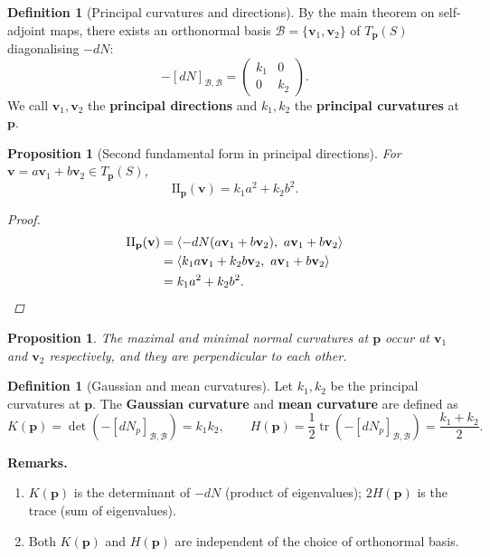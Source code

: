 \documentclass[10pt, a4paper]{article}
\theoremstyle{plain}
\newtheorem{proposition}[theorem]{Proposition}
\theoremstyle{definition}
\newtheorem{definition}[theorem]{Definition}
\theoremstyle{remark}
\begin{document}
\begin{definition}[Principal curvatures and directions]
  By the main theorem on self-adjoint maps, there exists an orthonormal basis
  $\mathcal{B} = \{\mathbf{v}_1, \mathbf{v}_2\}$ of $T_{\mathbf{p}}(S)$ diagonalising $-dN$:
  \[
    -[dN]_{\mathcal{B},\mathcal{B}} = \begin{pmatrix} k_1 & 0 \\ 0 & k_2 \end{pmatrix}.
  \]
  We call $\mathbf{v}_1, \mathbf{v}_2$ the \textbf{principal directions} and $k_1, k_2$ the
  \textbf{principal curvatures} at $\mathbf{p}$.
\end{definition}

\begin{proposition}[Second fundamental form in principal directions]
  For $\mathbf{v} = a\mathbf{v}_1 + b\mathbf{v}_2 \in T_{\mathbf{p}}(S)$,
  \[
    \mathrm{II}_{\mathbf{p}}(\mathbf{v}) = k_1 a^2 + k_2 b^2.
  \]

\begin{proof}
  \begin{align*}
    \mathrm{II}_{\mathbf{p}}(\mathbf{v})
    &= \langle -dN(a\mathbf{v}_1 + b\mathbf{v}_2),\ a\mathbf{v}_1 + b\mathbf{v}_2 \rangle \\
    &= \langle k_1 a\mathbf{v}_1 + k_2 b\mathbf{v}_2,\ a\mathbf{v}_1 + b\mathbf{v}_2 \rangle \\
    &= k_1 a^2 + k_2 b^2. \qedhere
  \end{align*}
\end{proof}

\end{proposition}



\begin{proposition}
  The maximal and minimal normal curvatures at $\mathbf{p}$ occur at $\mathbf{v}_1$ and
  $\mathbf{v}_2$ respectively, and they are perpendicular to each other.
\end{proposition}

\begin{definition}[Gaussian and mean curvatures]
  Let $k_1, k_2$ be the principal curvatures at $\mathbf{p}$. The \textbf{Gaussian curvature}
  and \textbf{mean curvature} are defined as
  \[
    K(\mathbf{p}) = \det(-[dN_p]_{\mathcal{B},\mathcal{B}}) = k_1 k_2,
    \qquad
    H(\mathbf{p}) = \frac{1}{2}\operatorname{tr}(-[dN_p]_{\mathcal{B},\mathcal{B}})
    = \frac{k_1 + k_2}{2}.
  \]

  \textbf{Remarks.}
  \begin{enumerate}
    \item $K(\mathbf{p})$ is the determinant of $-dN$ (product of eigenvalues); $2H(\mathbf{p})$
    is the trace (sum of eigenvalues).
    \item Both $K(\mathbf{p})$ and $H(\mathbf{p})$ are independent of the choice of
    orthonormal basis.
  \end{enumerate}
\end{definition}
\end{document}
